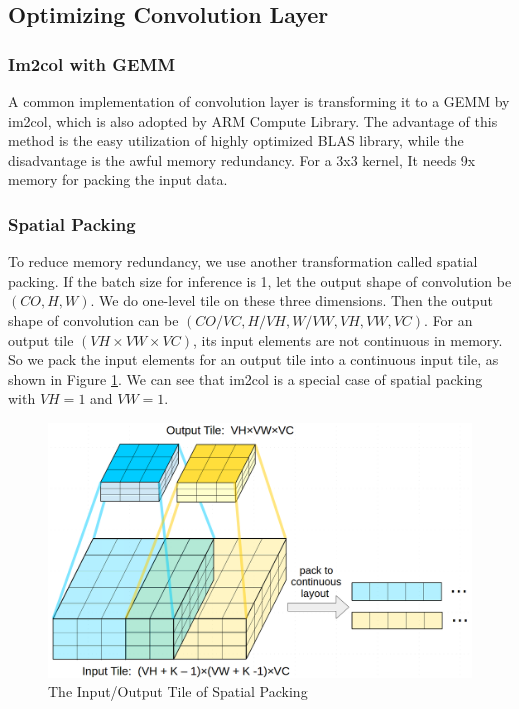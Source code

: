 \documentclass[sigplan]{acmart}
\begin{document}
\subsection {Optimizing Convolution Layer}
\subsubsection{Im2col with GEMM}
A common implementation of convolution layer is transforming it to a GEMM by im2col, which is also adopted by
ARM Compute Library\cite{armcompute}. The advantage of this method is the easy utilization of highly optimized 
BLAS library, while the disadvantage is the awful memory redundancy. For a 3x3 kernel, It needs 9x memory for 
packing the input data.


\subsubsection{Spatial Packing}
To reduce memory redundancy,  we use another transformation called spatial packing.
If the batch size for inference is 1, let the output shape of convolution be $(CO, H, W)$. 
We do one-level tile on these three dimensions. Then the output shape of convolution can
 be $(CO / VC, H/VH, W/VW, VH, VW, VC)$.
For an output tile $(VH \times VW \times VC)$, its input elements are not continuous in memory. 
So we pack the input elements for an output tile into a continuous input tile, as shown in Figure \ref{fig:tile}.
We can see that im2col is a special case of spatial packing with $VH=1$ and $VW=1$.

\begin{figure}[t]
\centering
\includegraphics[width=\columnwidth]{figures/spatial.png}
\caption{The Input/Output Tile of Spatial Packing}
\label{fig:tile}
\end{figure}
\end{document}
